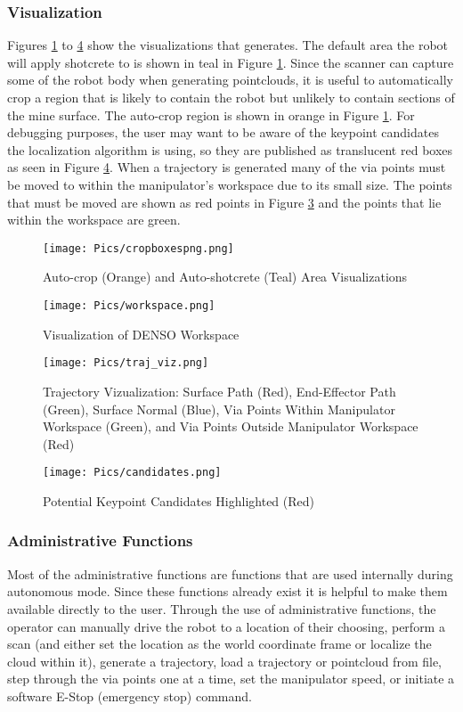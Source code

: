 \subsubsection{Visualization}
Figures \ref{fig:cropb} to \ref{fig:cands} show the visualizations that  generates. The default area the robot will apply shotcrete to is shown in teal in Figure \ref{fig:cropb}. Since the scanner can capture some of the robot body when generating pointclouds, it is useful to automatically crop a region that is likely to contain the robot but unlikely to contain sections of the mine surface. The auto-crop region is shown in orange in Figure \ref{fig:cropb}. For debugging purposes, the user may want to be aware of the keypoint candidates the localization algorithm is using, so they are published as translucent red boxes as seen in Figure \ref{fig:cands}. When a trajectory is generated many of the via points must be moved to within the manipulator's workspace due to its small size. The points that must be moved are shown as red points in Figure \ref{fig:trajviz} and the points that lie within the workspace are green.\\
\begin{figure}[h]
    \centering
    \texttt{[image: Pics/cropboxespng.png]}
    \caption{Auto-crop (Orange) and Auto-shotcrete (Teal) Area Visualizations}
    \label{fig:cropb}
\end{figure}
\begin{figure}[h]
    \centering
    \texttt{[image: Pics/workspace.png]}
    \caption{Visualization of DENSO Workspace}
    \label{fig:worksp}
\end{figure}
\begin{figure}[h]
    \centering
    \texttt{[image: Pics/traj\_viz.png]}
    \caption{Trajectory Vizualization: Surface Path (Red), End-Effector Path (Green), Surface Normal (Blue), Via Points Within Manipulator Workspace (Green), and Via Points Outside Manipulator Workspace (Red)}
    \label{fig:trajviz}
\end{figure}
\begin{figure}[h]
    \centering
    \texttt{[image: Pics/candidates.png]}
    \caption{Potential Keypoint Candidates Highlighted (Red)}
    \label{fig:cands}
\end{figure}
\subsubsection{Administrative Functions}
\label{sub:admin}
Most of the administrative functions are functions that are used internally during autonomous mode. Since these functions already exist it is helpful to make them available directly to the user. Through the use of administrative functions, the operator can manually drive the robot to a location of their choosing, perform a scan (and either set the location as the world coordinate frame or localize the cloud within it), generate a trajectory, load a trajectory or pointcloud from file, step through the via points one at a time, set the manipulator speed, or initiate a software E-Stop (emergency stop) command. \\

